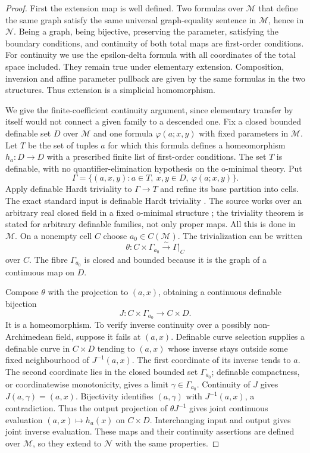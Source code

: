 \begin{proof}
First the extension map is well defined. Two formulas over $\mathcal M$
that define the same graph satisfy the same universal graph-equality
sentence in $\mathcal M$, hence in $\mathcal N$. Being a graph, being
bijective, preserving the parameter, satisfying the boundary conditions,
and continuity of both total maps are first-order conditions. For
continuity we use the epsilon-delta formula with all coordinates of the
total space included. They remain true under elementary extension.
Composition, inversion and affine parameter pullback are given by the
same formulas in the two structures. Thus extension is a simplicial
homomorphism.

We give the finite-coefficient continuity argument, since elementary
transfer by itself would not connect a given family to a descended one.
Fix a closed bounded definable set $D$ over $\mathcal M$ and one formula
$\varphi(a;x,y)$ with fixed parameters in $\mathcal M$. Let $T$ be the
set of tuples $a$ for which this formula defines a homeomorphism
$h_a:D\to D$ with a prescribed finite list of first-order conditions.
The set $T$ is definable, with no quantifier-elimination hypothesis on
the o-minimal theory. Put
\[
 \Gamma=\{(a,x,y):a\in T,\ x,y\in D,\ \varphi(a;x,y)\}.
\]
Apply definable Hardt triviality to $\Gamma\to T$ and refine its base
partition into cells. The exact standard input is definable Hardt triviality
\cite[Theorem~5.22, pp.~62--63]{Coste1999}. The source works over an
arbitrary real closed field in a fixed o-minimal structure
\cite[\S1.3, pp.~9--10]{Coste1999}; the triviality theorem is stated
for arbitrary definable families, not only proper maps. All this is done in $\mathcal M$. On a nonempty
cell $C$ choose $a_0\in C(\mathcal M)$. The trivialization can be
written
\[
 \theta:C\times\Gamma_{a_0}\xrightarrow{\sim}\Gamma|_C
\]
over $C$. The fibre $\Gamma_{a_0}$ is closed and bounded because it is
the graph of a continuous map on $D$.

Compose $\theta$ with the projection to $(a,x)$, obtaining a continuous
definable bijection
\[
 J:C\times\Gamma_{a_0}\longrightarrow C\times D.
\]
It is a homeomorphism. To verify inverse continuity over a possibly
non-Archimedean field, suppose it fails at $(a,x)$. Definable curve
selection supplies a definable curve in $C\times D$ tending to $(a,x)$
whose inverse stays outside some fixed neighbourhood of
$J^{-1}(a,x)$. The first coordinate of its inverse tends to $a$.
The second coordinate lies in the closed bounded set $\Gamma_{a_0}$;
definable compactness, or coordinatewise monotonicity, gives a limit
$\gamma\in\Gamma_{a_0}$. Continuity of $J$ gives
$J(a,\gamma)=(a,x)$. Bijectivity identifies $(a,\gamma)$ with
$J^{-1}(a,x)$, a contradiction. Thus the output projection of
$\theta J^{-1}$ gives joint continuous evaluation
$(a,x)\mapsto h_a(x)$ on $C\times D$.
Interchanging input and output gives joint inverse evaluation.
These maps and their continuity assertions are defined over
$\mathcal M$, so they extend to $\mathcal N$ with the same properties.


\end{proof}
